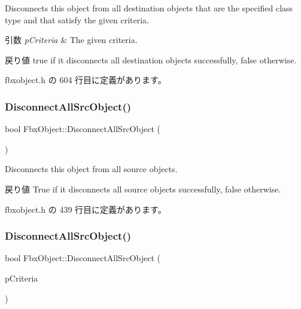 Disconnects this object from all destination objects that are the specified class type and that satisfy the given criteria. 
\begin{DoxyParams}{引数}
{\em p\+Criteria} & The given criteria. \\
\hline
\end{DoxyParams}
\begin{DoxyReturn}{戻り値}
{\ttfamily true} if it disconnects all destination objects successfully, {\ttfamily false} otherwise. 
\end{DoxyReturn}


 fbxobject.\+h の 604 行目に定義があります。

\mbox{\label{class_fbx_object_af1e035b53794520b66c3240a20660b40}} 
\subsubsection{\texorpdfstring{Disconnect\+All\+Src\+Object()}{DisconnectAllSrcObject()}\hspace{0.1cm}{\footnotesize\ttfamily [1/4]}}
{\footnotesize\ttfamily bool Fbx\+Object\+::\+Disconnect\+All\+Src\+Object (\begin{DoxyParamCaption}{ }\end{DoxyParamCaption})\hspace{0.3cm}{\ttfamily [inline]}}

Disconnects this object from all source objects. \begin{DoxyReturn}{戻り値}
{\ttfamily True} if it disconnects all source objects successfully, {\ttfamily false} otherwise. 
\end{DoxyReturn}


 fbxobject.\+h の 439 行目に定義があります。

\mbox{\label{class_fbx_object_ad6c02944e76b8d6780e734383f872a7d}} 
\subsubsection{\texorpdfstring{Disconnect\+All\+Src\+Object()}{DisconnectAllSrcObject()}\hspace{0.1cm}{\footnotesize\ttfamily [2/4]}}
{\footnotesize\ttfamily bool Fbx\+Object\+::\+Disconnect\+All\+Src\+Object (\begin{DoxyParamCaption}\item[{const \hyperlink{class_fbx_criteria}{Fbx\+Criteria} \&}]{p\+Criteria }\end{DoxyParamCaption})\hspace{0.3cm}{\ttfamily [inline]}}

